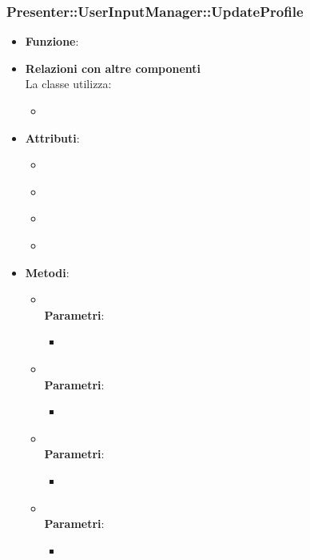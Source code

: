 \subsubsection{Presenter::UserInputManager::UpdateProfile}
\begin{itemize}
\item\textbf{Funzione}:
\item\textbf{Relazioni con altre componenti}\\
La classe utilizza:
	\begin{itemize}
		\item
	\end{itemize}
\item\textbf{Attributi}:
	\begin{itemize}
		\item\code{}\\
		\item\code{}\\
		\item\code{}\\
		\item\code{}\\
	\end{itemize}
\item\textbf{Metodi}:
	\begin{itemize}
		\item\code{}\\
		\textbf{Parametri}:
			\begin{itemize}
				\item\code{}\\
			\end{itemize}
		\item\code{}\\
		\textbf{Parametri}:
			\begin{itemize}
				\item\code{}\\
			\end{itemize}
		\item\code{}\\
		\textbf{Parametri}:
			\begin{itemize}
				\item\code{}\\
			\end{itemize}
		\item\code{}\\
		\textbf{Parametri}:
			\begin{itemize}
				\item\code{}\\
			\end{itemize}
	\end{itemize}
\end{itemize}

